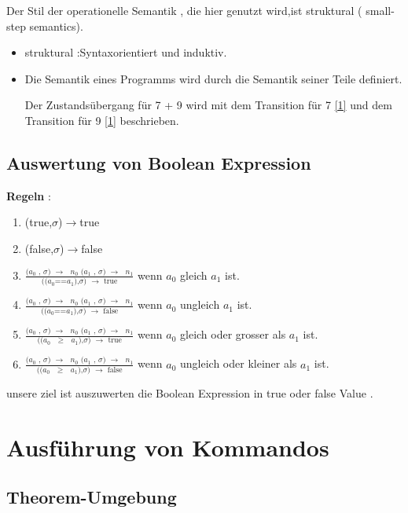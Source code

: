 \documentclass[a4paper,12pt,twoside,headsepline]{scrartcl}
\begin{document}
Der Stil der operationelle  Semantik , die hier genutzt wird,ist struktural ( small-step semantics).
\begin{itemize}
\item struktural :Syntaxorientiert und induktiv.
\item Die Semantik eines Programms wird durch  die Semantik seiner Teile definiert.


Der Zustandsübergang für 7 + 9 wird mit dem Transition für 7 \ref{1} und dem Transition für 9 \ref {1} beschrieben.
\end{itemize}
              
\subsection{Auswertung von Boolean Expression}       
 \textbf{Regeln} :
 \begin{enumerate}
 \item \label{11} (true,$\sigma$)$\to$true
	\item \label{12} (false,$\sigma$)$\to$false
	\item \label{13}  $\frac  {\text {($a_0$ , $\sigma$) $\to$ $n_0$   ($a_1$ , $\sigma$) $\to$ $n_1$} } { \text{(($a_0$==$a_1$),$\sigma$) $\to$ true} }$  
	wenn $a_0$ gleich $a_1$ ist.
	\item \label{14}  $\frac  {\text {($a_0$ , $\sigma$) $\to$ $n_0$   ($a_1$ , $\sigma$) $\to$ $n_1$} } { \text{(($a_0$==$a_1$),$\sigma$) $\to$ false} }$
	wenn $a_0$ ungleich $a_1$ ist.
	\item \label{15}  $\frac  {\text {($a_0$ , $\sigma$) $\to$ $n_0$   ($a_1$ , $\sigma$) $\to$ $n_1$} } { \text{(($a_0$ $\geq$ $a_1$),$\sigma$) $\to$ true} }$
	wenn $a_0$ gleich oder grosser als $a_1$ ist.
	\item \label{16}  $\frac  {\text {($a_0$ , $\sigma$) $\to$ $n_0$   ($a_1$ , $\sigma$) $\to$ $n_1$} } { \text{(($a_0$ $\geq$ $a_1$),$\sigma$) $\to$ false} }$
	wenn $a_0$ ungleich oder kleiner als $a_1$ ist.
\end{enumerate}   
unsere ziel ist  auszuwerten die Boolean Expression in true oder false Value . 

\section{Ausführung von Kommandos}     
                     
\subsection{Theorem-Umgebung}
\end{document}
